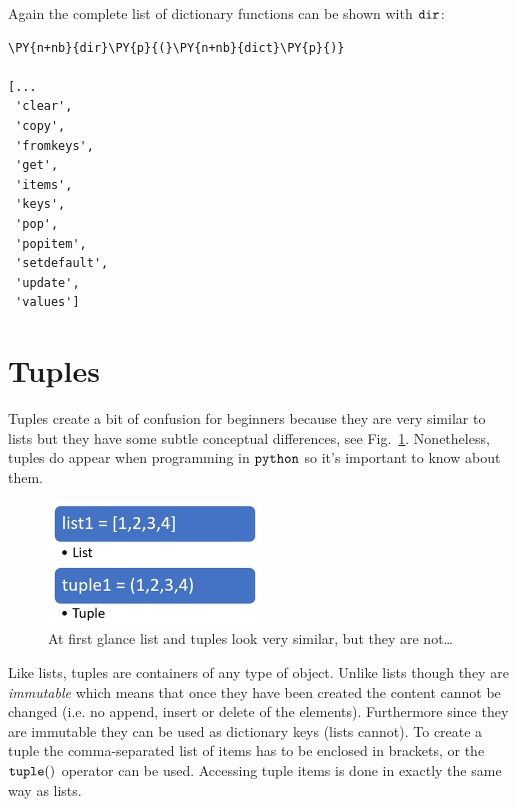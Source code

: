 Again the complete list of dictionary functions can be shown with $\tt{dir}$:

\begin{codebox}[breakable, size=fbox, boxrule=1pt, pad at break*=1mm,colback=cellbackground, colframe=cellborder]
\begin{Verbatim}[commandchars=\\\{\}]
\PY{n+nb}{dir}\PY{p}{(}\PY{n+nb}{dict}\PY{p}{)}

[...
 'clear',
 'copy',
 'fromkeys',
 'get',
 'items',
 'keys',
 'pop',
 'popitem',
 'setdefault',
 'update',
 'values']
\end{Verbatim}
\end{codebox}

\section{Tuples}\label{tuples}

Tuples create a bit of confusion for beginners because they are very similar to lists 
but they have some subtle conceptual differences, see Fig.~\ref{fig:tuples}.
Nonetheless, tuples do appear when programming in $\tt{python}$ so it's important to know about them.

\begin{figure}[hb]
\centering
\includegraphics[width=0.5\textwidth]{figures/Difference-Between-List-and-Tuple-fig-1-2.jpg}
\caption{At first glance list and tuples look very similar, but they are not\ldots}
\label{fig:tuples}
\end{figure}

Like lists, tuples are containers of any type of object. Unlike lists though they are 
\emph{immutable} which means that once they have been created the content cannot be 
changed (i.e. no append, insert or delete of the elements). Furthermore since they are 
immutable they can be used as dictionary keys (lists cannot).
To create a tuple the comma-separated list of items has to be enclosed in brackets, or 
the $\tt{tuple()}$ operator can be used.
Accessing tuple items is done in exactly the same way as lists.

